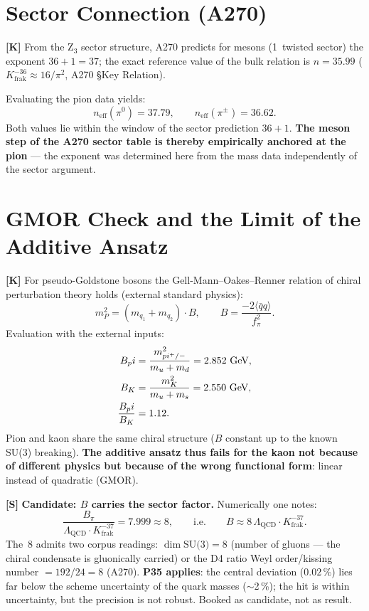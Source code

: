 \section{Sector Connection (A270)}

\textbf{[K]} From the Z$_3$ sector structure, A270 predicts for mesons
(1~twisted sector) the exponent $36+1 = 37$; the exact reference value
of the bulk relation is $n = 35{.}99$
($K_\text{frak}^{-36} \approx 16/\pi^2$, A270 \S{}Key Relation).

Evaluating the pion data yields:
\[
  n_\text{eff}(\pi^0) = 37{.}79, \qquad n_\text{eff}(\pi^\pm) = 36{.}62.
\]
Both values lie within the window of the sector prediction $36+1$.
\textbf{The meson step of the A270 sector table is thereby empirically
anchored at the pion} --- the exponent was determined here from the
mass data independently of the sector argument.

\section{GMOR Check and the Limit of the Additive Ansatz}

\textbf{[K]} For pseudo-Goldstone bosons the Gell-Mann--Oakes--Renner
relation of chiral perturbation theory holds (external standard
physics):
\[
  m_P^2 = (m_{q_1} + m_{q_2})\cdot B,
  \qquad B = \frac{-2\langle\bar qq\rangle}{f_\pi^2}.
\]
Evaluation with the external inputs:
\begin{align}
  B_\pi &= \frac{m_{\pi^\pm}^2}{m_u+m_d} = 2{.}852\ \text{GeV}, \notag\\
  B_K   &= \frac{m_K^2}{m_u+m_s} = 2{.}550\ \text{GeV}, \notag\\
  \frac{B_\pi}{B_K} &= 1{.}12. \notag
\end{align}
Pion and kaon share the same chiral structure ($B$ constant up to the
known SU(3) breaking). \textbf{The additive ansatz thus fails for the
kaon not because of different physics but because of the wrong
functional form}: linear instead of quadratic (GMOR).

\medskip
\textbf{[S]} \textbf{Candidate: $B$ carries the sector factor.}
Numerically one notes:
\[
  \frac{B_\pi}{\Lambda_\text{QCD}\cdot K_\text{frak}^{-37}}
  = 7{.}999 \approx 8,
  \qquad\text{i.e.}\qquad
  B \approx 8\,\Lambda_\text{QCD}\cdot K_\text{frak}^{-37}.
\]
The~8 admits two corpus readings: $\dim\text{SU(3)} = 8$ (number of
gluons --- the chiral condensate is gluonically carried) or the D4
ratio Weyl order/kissing number $= 192/24 = 8$ (A270).
\textbf{P35 applies}: the central deviation ($0{.}02\,\%$) lies far
below the scheme uncertainty of the quark masses ($\sim$2\,\%); the hit
is within uncertainty, but the precision is not robust. Booked as
candidate, not as result.

